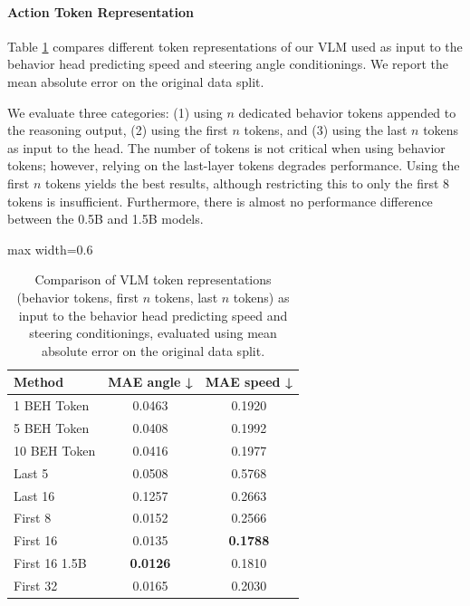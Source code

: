 \documentclass[letterpaper, 10 pt, conference]{ieeeconf}
\begin{document}
\paragraph{Action Token Representation}
Table \ref{tab:token_rep} compares different token representations of our VLM used as input to the behavior head predicting speed and steering angle conditionings. We report the mean absolute error on the original data split.

We evaluate three categories: (1) using $n$ dedicated behavior tokens appended to the reasoning output, (2) using the first $n$ tokens, and (3) using the last $n$ tokens as input to the head. The number of tokens is not critical when using behavior tokens; however, relying on the last-layer tokens degrades performance. Using the first $n$ tokens yields the best results, although restricting this to only the first 8 tokens is insufficient. Furthermore, there is almost no performance difference between the 0.5B and 1.5B models.
\begin{table}[!t]
\vspace{3mm}
\caption{Comparison of VLM token representations (behavior tokens, first $n$ tokens, last $n$ tokens) as input to the behavior head predicting speed and steering conditionings, evaluated using mean absolute error on the original data split.}
\vspace{5mm}
    \centering
    \renewcommand{\arraystretch}{1.2}
    \begin{adjustbox}{max width=0.6\textwidth}
    \begin{tabular}{l|c|c}
        \textbf{Method}

        & \textbf{MAE angle ↓} 
        & \textbf{MAE speed ↓} \\
 
        \hline

        1 BEH Token

   
          & 0.0463 & 0.1920 \\
        
        
        5 BEH Token
         & 0.0408 & 0.1992 \\


        10 BEH Token
  &  0.0416 & 0.1977 \\

                   Last 5
   & 0.0508 & 0.5768 \\
   
        Last 16
   & 0.1257 & 0.2663 \\
   
        
        First 8
   & 0.0152 & 0.2566 \\
        
        First 16
  & 0.0135 & \textbf{0.1788} \\

        First 16 1.5B
  & \textbf{0.0126} & 0.1810 \\

        First 32
   & 0.0165 & 0.2030 \\
        

        \end{tabular}
    \end{adjustbox}
    \label{tab:token_rep}
\end{table}
\end{document}
